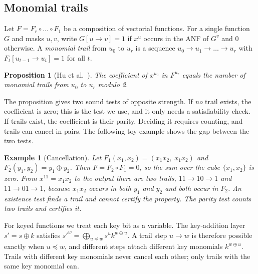 \documentclass[pdflatex,sn-mathphys-num]{sn-jnl}
\theoremstyle{thmstyleone}
\newtheorem{proposition}{Proposition}
\theoremstyle{thmstylethree}
\theoremstyle{thmstyletwo}
\newtheorem{example}{Example}
\begin{document}
\subsection{Monomial trails}
Let $F=F_r\circ\dots\circ F_1$ be a composition of vectorial functions. For a single function $G$ and masks $u,v$, write $G[u\to v]=1$ if $x^u$ occurs in the ANF of $G^v$ and $0$ otherwise. A \emph{monomial trail} from $u_0$ to $u_r$ is a sequence $u_0\to u_1\to\dots\to u_r$ with $F_t[u_{t-1}\to u_t]=1$ for all $t$.

\begin{proposition}[Hu et al.~\cite{hu2020mp}]\label{prop:mp}
The coefficient of $x^{u_0}$ in $F^{u_r}$ equals the number of monomial trails from $u_0$ to $u_r$ modulo 2.
\end{proposition}

The proposition gives two sound tests of opposite strength. If \emph{no} trail exists, the coefficient is zero; this is the test we use, and it only needs a satisfiability check. If trails exist, the coefficient is their parity. Deciding it requires counting, and trails can cancel in pairs. The following toy example shows the gap between the two tests.

\begin{example}[Cancellation]\label{ex:cancel}
Let $F_1(x_1,x_2)=(x_1x_2,\;x_1x_2)$ and $F_2(y_1,y_2)=y_1\oplus y_2$. Then $F=F_2\circ F_1=0$, so the sum over the cube $\{x_1,x_2\}$ is zero. From $x^{11}=x_1x_2$ to the output there are two trails, $11\to10\to1$ and $11\to01\to1$, because $x_1x_2$ occurs in both $y_1$ and $y_2$ and both occur in $F_2$. An existence test finds a trail and cannot certify the property. The parity test counts two trails and certifies it.
\end{example}

For keyed functions we treat each key bit as a variable. The key-addition layer $s'=s\oplus k$ satisfies $s'^w=\bigoplus_{u\preceq w}s^uk^{w\oplus u}$. A trail step $u\to w$ is therefore possible exactly when $u\preceq w$, and different steps attach different key monomials $k^{w\oplus u}$. Trails with different key monomials never cancel each other; only trails with the same key monomial can.
\end{document}
